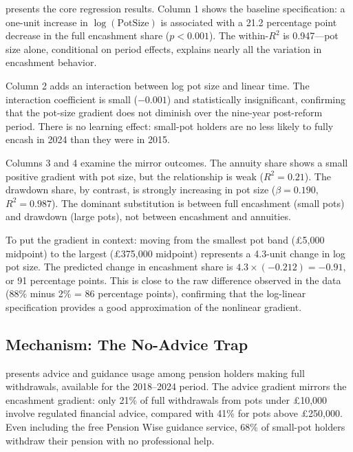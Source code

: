 \documentclass[12pt]{article}
\begin{document}
 presents the core regression results. Column 1 shows the baseline specification: a one-unit increase in $\log(\text{PotSize})$ is associated with a 21.2 percentage point decrease in the full encashment share ($p < 0.001$). The within-$R^2$ is 0.947---pot size alone, conditional on period effects, explains nearly all the variation in encashment behavior.

Column 2 adds an interaction between log pot size and linear time. The interaction coefficient is small ($-0.001$) and statistically insignificant, confirming that the pot-size gradient does not diminish over the nine-year post-reform period. There is no learning effect: small-pot holders are no less likely to fully encash in 2024 than they were in 2015.

Columns 3 and 4 examine the mirror outcomes. The annuity share shows a small positive gradient with pot size, but the relationship is weak ($R^2 = 0.21$). The drawdown share, by contrast, is strongly increasing in pot size ($\beta = 0.190$, $R^2 = 0.987$). The dominant substitution is between full encashment (small pots) and drawdown (large pots), not between encashment and annuities.



To put the gradient in context: moving from the smallest pot band (\pounds5,000 midpoint) to the largest (\pounds375,000 midpoint) represents a 4.3-unit change in log pot size. The predicted change in encashment share is $4.3 \times (-0.212) = -0.91$, or 91 percentage points. This is close to the raw difference observed in the data (88\% minus 2\% = 86 percentage points), confirming that the log-linear specification provides a good approximation of the nonlinear gradient.

\subsection{Mechanism: The No-Advice Trap}

 presents advice and guidance usage among pension holders making full withdrawals, available for the 2018--2024 period. The advice gradient mirrors the encashment gradient: only 21\% of full withdrawals from pots under \pounds10,000 involve regulated financial advice, compared with 41\% for pots above \pounds250,000. Even including the free Pension Wise guidance service, 68\% of small-pot holders withdraw their pension with no professional help.


\end{document}
